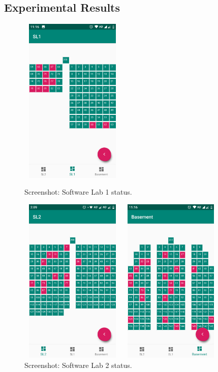 \documentclass[oneside,a4paper,12pt]{article}
\begin{document}
\subsection{Experimental Results}
\begin{figure}[H]
    \centering
        \begin{minipage}{0.46\textwidth}
            \centering
            \includegraphics[width=5cm,height=8cm]{assets/SL1.png}
            \caption{Screenshot: Software Lab 1 status.}
        \end{minipage}\hfill
        \begin{minipage}{0.46\textwidth}
            \centering
            \includegraphics[width=5cm,height=8cm]{assets/SL2.png}
            \caption{Screenshot: Software Lab 2 status.}
        \end{minipage}\hfill
        \begin{minipage}{0.46\textwidth}
            \centering
            \includegraphics[width=5cm,height=8cm]{assets/Basement.png}

\end{minipage}
\end{figure}
\end{document}
